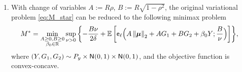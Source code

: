 \begin{lem}
\begin{enumerate}[label=(\alph*)]
        

        \item \label{lem:M_star_var(c)}

        With change of variables $A := R \rho$, $B := R \sqrt{1 - \rho^2}$, the original variational problem \cref{eq:M_star} can be reduced to the following minimax problem
        \[ 
        M^* = 
        \min_{\substack{ A \ge 0, B \ge 0 \\ \beta_0 \in \mathbb{R}} }
        \sup_{\nu > 0} 
        \,
         \biggl\{ 
        - \frac{B \nu}{2 \delta }
        +
        \mathbb{E} \left[ \mathsf{e}_{\ell} \Bigl( A \left\|{{\boldsymbol{\mu}}}\right\|_2 + A G_1 + B G_2 + \beta_0 Y ; \frac{B}{\nu} \Bigr) \right]
        \biggr\},
        \]
        where $(Y, G_1, G_2) \sim P_y \times {\sf N}(0, 1) \times {\sf N}(0, 1)$, and the objective function is convex-concave.
    \end{enumerate}
\end{lem}

